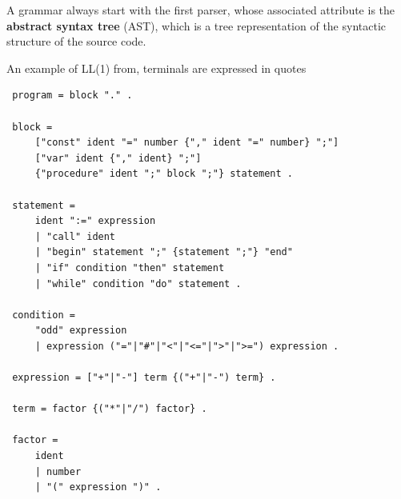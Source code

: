 A grammar always start with the first parser, whose associated attribute is the
{\bf abstract syntax tree} (AST), which is a tree representation of the
syntactic structure of the source code.

An example of LL(1) from, terminals are expressed in quotes
{\small \begin{verbatim}
 program = block "." .
 
 block =
     ["const" ident "=" number {"," ident "=" number} ";"]
     ["var" ident {"," ident} ";"]
     {"procedure" ident ";" block ";"} statement .
 
 statement =
     ident ":=" expression
     | "call" ident
     | "begin" statement ";" {statement ";"} "end"
     | "if" condition "then" statement
     | "while" condition "do" statement .
 
 condition =
     "odd" expression
     | expression ("="|"#"|"<"|"<="|">"|">=") expression .
 
 expression = ["+"|"-"] term {("+"|"-") term} .
 
 term = factor {("*"|"/") factor} .
 
 factor =
     ident
     | number
     | "(" expression ")" .
\end{verbatim}}


